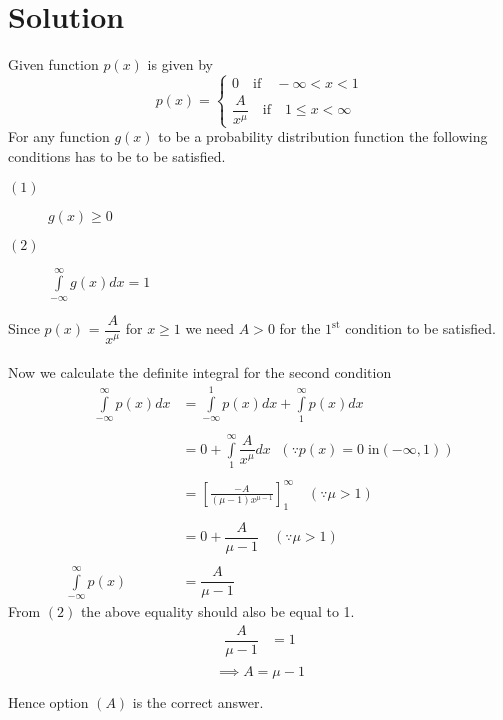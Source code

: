 \documentclass[journal,12pt,twocolumn]{IEEEtran}
\providecommand{\brak}[1]{\ensuremath{\left(#1\right)}}
\begin{document}
\section*{Solution}
Given function $p\brak{x}$ is given by
\begin{equation}
\nonumber p\brak{x}=
\begin{cases}
0 \quad \text{if}\quad -\infty<x<1\\
\dfrac{A}{x^\mu} \quad \text{if} \quad 1\leq x < \infty
\end{cases}
\end{equation}
For any function $g\brak{x}$ to be a probability distribution function the following conditions has to be to be satisfied.\\
\begin{description}
\item[$\brak{1}$] $g\brak{x} \geq 0$\\
\item[$\brak{2}$] $\int\limits_{-\infty}^{\infty}g\brak{x}dx = 1$
\end{description}
Since  $p\brak{x}$ = $\dfrac{A}{x^\mu}$ for $x\geq1$ we need $A>0$ for the $1^\text{st}$ condition to be satisfied.\\\\
Now we calculate the definite integral for the second condition
\begin{align}
\nonumber   \qquad \int\limits_{-\infty}^{\infty}p\brak{x}dx &=\int\limits_{-\infty}^{1}p\brak{x}dx + \int\limits_{1}^{\infty}p\brak{x}dx   \\\nonumber\\
\nonumber &= 0 + \int\limits_{1}^{\infty}\dfrac{A}{x^\mu}dx \:\:\, \brak{\because p\brak{x} = 0 \;\text{in} \brak{-\infty,1}}\\\nonumber\\
\nonumber  &= \left[\frac{-A}{\brak{\mu-1}x^{\mu-1}}\right]_{1}^{\infty}  \quad \brak{\because \mu > 1}\\\nonumber\\
\nonumber  &= 0 + \dfrac{A}{\mu-1}  \quad \brak{\because \mu > 1}\\\nonumber\\
\nonumber \int\limits_{-\infty}^{\infty}p\brak{x} &= \dfrac{A}{\mu-1}
\end{align}
From $\brak{2}$ the above equality should also  be equal to 1. 
\begin{align}
\nonumber \dfrac{A}{\mu-1} &=1\\\nonumber
\end{align}
$$\implies A = \mu-1$$

Hence option $\brak{A}$ is the correct answer.
\end{document}
